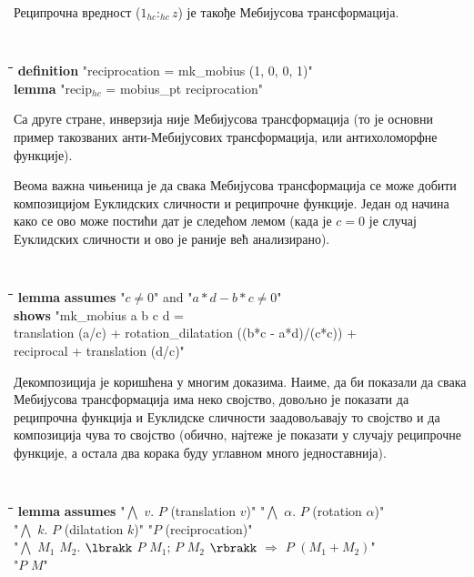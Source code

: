Реципрочна вредност ($1_{hc}:_{hc}z$) је такође Мебијусова трансформација. 
{\tt
\begin{tabbing}
\hspace{5mm}\=\hspace{5mm}\=\hspace{5mm}\=\hspace{5mm}\=\hspace{5mm}\=\kill
{\bf definition} "reciprocation = mk\_mobius (1, 0, 0, 1)"\\
{\bf lemma} "recip$_{hc}$ = mobius\_pt reciprocation"
\end{tabbing}
}
\noindent Са друге стране, инверзија није Мебијусова трансформација
(то је основни пример такозваних анти-Мебијусових трансформација, или
антихоломорфне функције). 

Веома важна чињеница је да свака Мебијусова трансформација се може
добити композицијом Еуклидских сличности и реципрочне функције. Један
од начина како се ово може постићи дат је следећом лемом (када је
$c=0$ је случај Еуклидских сличности и ово је раније већ анализирано).

{\tt
\begin{tabbing}
\hspace{5mm}\=\hspace{5mm}\=\hspace{5mm}\=\hspace{5mm}\=\hspace{5mm}\=\kill
{\bf lemma} \= {\bf assumes} "$c\neq 0$" and "$a*d - b*c \neq 0$"\\
{\bf shows} "mk\_mobius a b c d = \\
\>\>\> translation (a/c) + rotation\_dilatation ((b*c - a*d)/(c*c)) + \\
\>\>\> reciprocal + translation (d/c)"
\end{tabbing}
}

\noindent Декомпозиција је коришћена у многим доказима. Наиме, да би
показали да свака Мебијусова трансформација има неко својство, довољно
је показати да реципрочна функција и Еуклидске сличности заадовољавају
то својство и да композиција чува то својство (обично, најтеже је
показати у случају реципрочне функције, а остала два корака буду
углавном много једноставнија).

{\tt
\begin{tabbing}
\hspace{5mm}\=\hspace{5mm}\=\hspace{5mm}\=\hspace{5mm}\=\hspace{5mm}\=\kill
{\bf lemma} {\bf assumes} "$\bigwedge$ $v$. $P$ (translation $v$)" "$\bigwedge$ $\alpha$. $P$ (rotation $\alpha$)"\\
\> "$\bigwedge$ $k$. $P$ (dilatation $k$)" "$P$ (reciprocation)"\\
\> "$\bigwedge$ $M_1$ $M_2$. $\lbrakk$ $P$ $M_1$; $P$ $M_2$ $\rbrakk$ $\Longrightarrow$ $P$ $(M_1 + M_2)$"\\
 "$P$ $M$"
\end{tabbing}
}

